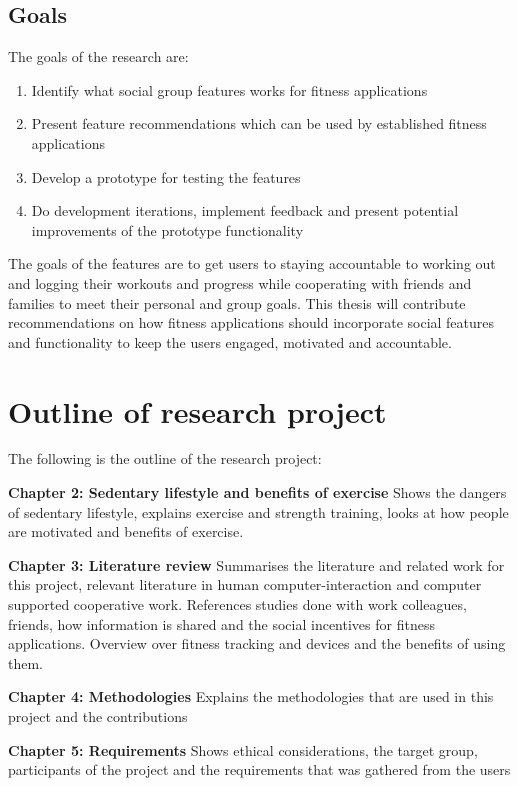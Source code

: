 \subsection{Goals}
The goals of the research are:
\begin{enumerate}
\item Identify what social group features works for fitness applications
\item Present feature recommendations which can be used by established fitness applications
\item Develop a prototype for testing the features
\item Do development iterations, implement feedback
 and present potential improvements of the prototype functionality 
\end{enumerate}
The goals of the features are to get users to staying accountable to working out and logging their workouts and progress while cooperating with friends and families to meet their personal and group goals.
This thesis will contribute recommendations on how fitness applications should incorporate social features and functionality to keep the users engaged, motivated and accountable.
 
\newpage
 
\section{Outline of research project}
The following is the outline of the research project:

\textbf{Chapter 2: Sedentary lifestyle and benefits of exercise} Shows the dangers of sedentary lifestyle, explains exercise and strength training, looks at how people are motivated and benefits of exercise.

\textbf{Chapter 3: Literature review} Summarises the literature and related work for this project, relevant literature in human computer-interaction and computer supported cooperative work. References studies done with work colleagues, friends, how information is shared and the social incentives for fitness applications. Overview over fitness tracking and devices and the benefits of using them.

\textbf{Chapter 4: Methodologies} Explains the methodologies that are used in this project and the contributions

\textbf{Chapter 5: Requirements} Shows ethical considerations, the target group, participants of the project and the requirements that was gathered from the users

